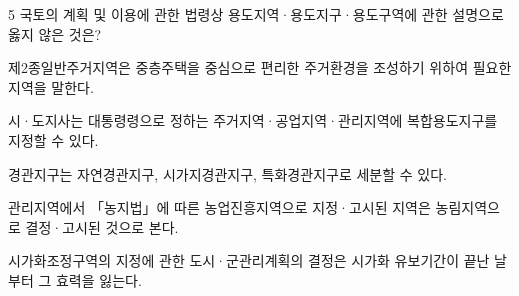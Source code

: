 \begin{question}{5}
국토의 계획 및 이용에 관한 법령상 용도지역·용도지구·용도구역에 관한 설명으로 옳지 않은 것은?
\begin{choices}
  \item 제2종일반주거지역은 중층주택을 중심으로 편리한 주거환경을 조성하기 위하여 필요한 지역을 말한다.
  \item 시·도지사는 대통령령으로 정하는 주거지역·공업지역·관리지역에 복합용도지구를 지정할 수 있다.
  \item 경관지구는 자연경관지구, 시가지경관지구, 특화경관지구로 세분할 수 있다.
  \item 관리지역에서 「농지법」에 따른 농업진흥지역으로 지정·고시된 지역은 농림지역으로 결정·고시된 것으로 본다.
  \item 시가화조정구역의 지정에 관한 도시·군관리계획의 결정은 시가화 유보기간이 끝난 날부터 그 효력을 잃는다.
\end{choices}
\end{question}
